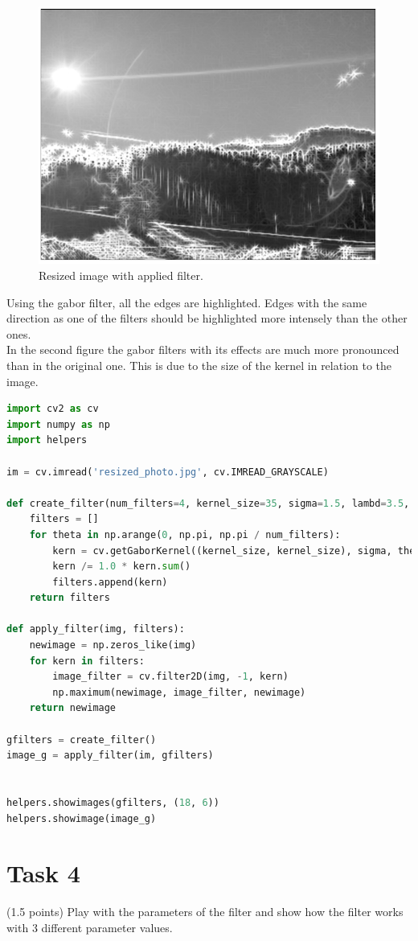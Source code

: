 \documentclass[UTF-8]{article}
\begin{document}
\begin{figure}[H]
	\centering
	\includegraphics[width=0.7\linewidth, scale=1.1]{gabor3}
	\caption{Resized image with applied filter.}
	\label{fig:gabor2}
\end{figure}

Using the gabor filter, all the edges are highlighted. Edges with the same direction as one of the filters should be highlighted more intensely than the other ones.
\\
In the second figure the gabor filters with its effects are much more pronounced than in the original one. This is due to the size of the kernel in relation to the image.

\begin{lstlisting}[language=python]
import cv2 as cv
import numpy as np
import helpers

im = cv.imread('resized_photo.jpg', cv.IMREAD_GRAYSCALE)

def create_filter(num_filters=4, kernel_size=35, sigma=1.5, lambd=3.5, gamma=0.5, psi=0.1):
	filters = []
	for theta in np.arange(0, np.pi, np.pi / num_filters):
		kern = cv.getGaborKernel((kernel_size, kernel_size), sigma, theta, lambd, gamma, psi, ktype=cv.CV_64F)
		kern /= 1.0 * kern.sum()
		filters.append(kern)
	return filters

def apply_filter(img, filters):
	newimage = np.zeros_like(img)
	for kern in filters:
		image_filter = cv.filter2D(img, -1, kern)
		np.maximum(newimage, image_filter, newimage)
	return newimage

gfilters = create_filter()
image_g = apply_filter(im, gfilters)


helpers.showimages(gfilters, (18, 6))
helpers.showimage(image_g)\end{lstlisting}


\newpage
\section*{Task 4}
(1.5 points) Play with the parameters of the filter and show how the filter works with 3 different
parameter values.
\end{document}
